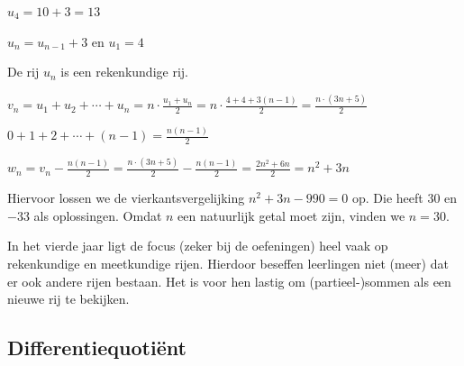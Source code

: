 
\begin{nummering}
\item	$u_4=10+3=13$
\item	$u_n=u_{n-1}+3$   en  $u_1=4$

De rij $u_n$ is een rekenkundige rij.
\item $\displaystyle v_n=u_1+u_2+ \cdots +u_n = n\cdot \frac{u_1+u_n}{2}= n \cdot \frac{4+4+3(n-1)}{2} = \frac{n \cdot (3n+5)}{2}$
\item $\displaystyle 0+1+2+ \cdots +(n-1)=\frac{n(n-1)}{2}$
\item	$\displaystyle w_n=v_n-\frac{n(n-1)}{2}=\frac{n \cdot (3n+5)}{2}- \frac{n(n-1)}{2} = \frac{2n^2+6n}{2} = n^2+3n$
\item	Hiervoor lossen we de vierkantsvergelijking $n^2+3n-990=0$ op. Die heeft $30$ en $-33$ als oplossingen. Omdat $n$ een natuurlijk getal moet zijn, vinden we $n=30$.
\end{nummering}


In het vierde jaar ligt de focus (zeker bij de oefeningen) heel vaak op rekenkundige en meetkundige rijen. Hierdoor beseffen leerlingen niet (meer) dat er ook andere rijen bestaan. Het is voor hen lastig om (partieel-)sommen als een nieuwe rij te bekijken. 




\subsection{Differentiequotiënt}


